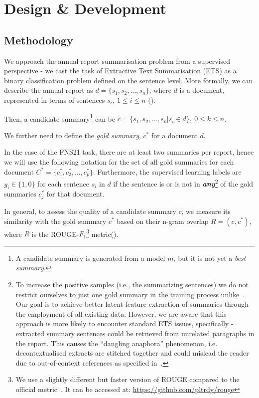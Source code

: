 \section{Design \& Development}\label{sec:design-and-development}

\subsection{Methodology}\label{subsec:methodology}
We approach the annual report summarisation problem from a supervised perspective - we cast the task of Extractive Text Summarisation (ETS) as a binary classification problem defined on the sentence level.
More formally, we can describe the annual report as $d=\{s_{1}, s_{2}, \dots, s_{n}\}$, where $d$ is a document, represented in terms of sentences $s_{i}, \  1 \leq i \leq n$ (\cite{liu2019finetuningbert}).

Then, a candidate summary\footnote{
    A candidate summary is generated from a model $m_{i}$ but it is not yet a \emph{best summary}.
} can be $c=\{s_{1}, s_{2}, \dots, s_{k} | s_{i} \in d \}, \ 0 \leq k \leq n$.

We further need to define the \emph{gold summary}, $c^{*}$ for a document $d$.

In the case of the FNS21 task, there are at least two summaries per report, hence we will use the following notation for the set of all gold summaries for each document $C^{*} = \{c^{*}_{1}, c^{*}_{2}, \dots, c^{*}_{p}\}$.
Furthermore, the supervised learning labels are $y_{i} \in \{1,0\}$ for each sentence $s_{i}$ in $d$ if the sentence is or is not in \textbf{\emph{any}}\footnote{
    To increase the positive samples (i.e., the summarizing sentences) we do not restrict ourselves to just one gold summary in the training process unlike~\cite{orzhenovskii-2021-t5}.
    Our goal is to achieve better latent feature extraction of summaries through the employment of all existing data.
    However, we are aware that this approach is more likely to encounter standard ETS issues, specifically - extracted summary sentences could be retrieved from unrelated paragraphs in the report.
    This causes the \enquote{dangling anaphora} phenomenon, i.e. decontextualised extracts are stitched together and could mislead the reader due to out-of-context references as specified in~\cite{lin2009summarization}.
} of the gold summaries $c^{*}_{j}$ for that document.

In general, to assess the quality of a candidate summary $c$, we measure its similarity with the gold summary $c^{*}$ based on their n-gram overlap $R=(c, c^{*})$, where $R$ is the ROUGE-$F_{1}$\footnote{
    We use a slightly different but faster version of ROUGE compared to the official metric~\cite{lin2004rouge}.
    It can be accessed at: \url{https://github.com/pltrdy/rouge}
    } metric(\cite{lin2004rouge}).

